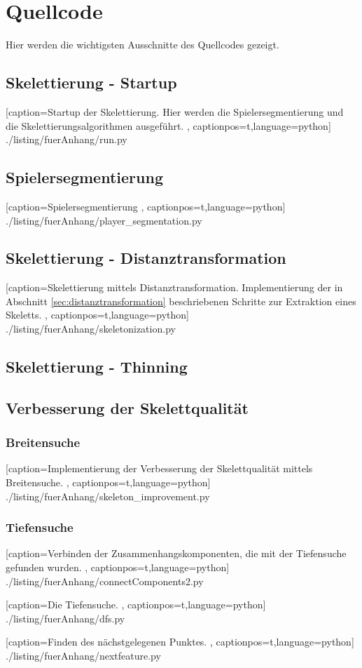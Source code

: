 \chapter{Quellcode}
\label{anhang:quellcode}
Hier werden die wichtigsten Ausschnitte des Quellcodes gezeigt. 
\section{Skelettierung - Startup}
 
    [caption={Startup der Skelettierung. Hier werden die Spielersegmentierung und die Skelettierungsalgorithmen ausgeführt.}
       \label{lst:startup},
       captionpos=t,language=python]
 {./listing/fuerAnhang/run.py}
\section{Spielersegmentierung}

    [caption={Spielersegmentierung}
       \label{lst:anhang_spielersegmentierung},
       captionpos=t,language=python]
 {./listing/fuerAnhang/player_segmentation.py}
\section{Skelettierung - Distanztransformation}

    [caption={Skelettierung mittels Distanztransformation. Implementierung der in Abschnitt \ref{sec:distanztransformation} beschriebenen Schritte zur Extraktion eines Skeletts.}
       \label{lst:anhang_distanztransformation},
       captionpos=t,language=python]
 {./listing/fuerAnhang/skeletonization.py}
\section{Skelettierung - Thinning}
\section{Verbesserung der Skelettqualität}
\subsection{Breitensuche}
 
    [caption={Implementierung der Verbesserung der Skelettqualität mittels Breitensuche.}
       \label{lst:breitensuche},
       captionpos=t,language=python]
 {./listing/fuerAnhang/skeleton_improvement.py}
 \newpage
\subsection{Tiefensuche}

    [caption={Verbinden der Zusammenhangskomponenten, die mit der Tiefensuche gefunden wurden.}
       \label{lst:connectcomponents},
       captionpos=t,language=python]
 {./listing/fuerAnhang/connectComponents2.py}
 
 
     [caption={Die Tiefensuche.}
        \label{lst:tiefensuche},
        captionpos=t,language=python]
  {./listing/fuerAnhang/dfs.py}
  
 
      [caption={Finden des nächstgelegenen Punktes.}
         \label{lst:findnextfeature},
         captionpos=t,language=python]
   {./listing/fuerAnhang/nextfeature.py}
